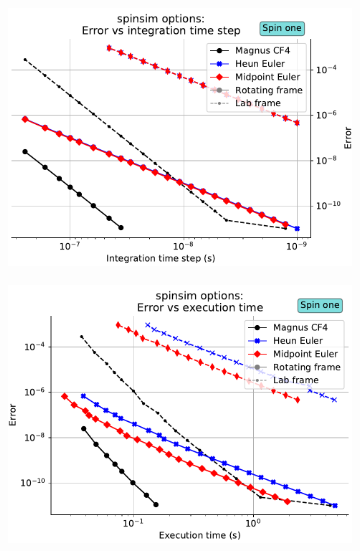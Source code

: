 \documentclass{jors}
\begin{document}
		\begin{figure}[h!]
			\begin{subfigure}[b]{0.475\textwidth}
				\includegraphics[scale=0.475]{benchmark_spin_one_step_error.pdf}
				\caption{}
				\label{fig:benchmark_spin_one_step_error}
			\end{subfigure}
			\hfill
			\begin{subfigure}[b]{0.475\textwidth}
				\includegraphics[scale=0.475]{benchmark_spin_one_execution_error.pdf}
				\caption{}
				\label{fig:benchmark_spin_one_execution_error}
			\end{subfigure}\

\end{figure}
\end{document}
